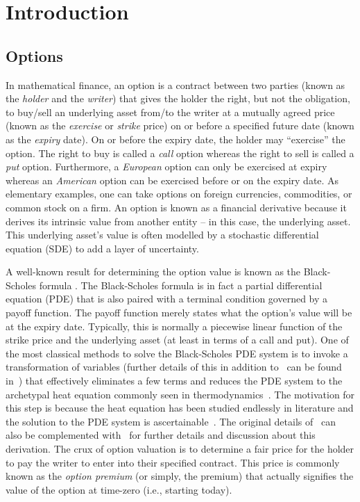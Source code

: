 \chapter{Introduction}
\section{Options}

	In mathematical finance, an option is a contract between two parties (known as the \emph{holder} and the \emph{writer}) that gives the holder the right, but not the obligation, to buy/sell an underlying asset from/to the writer at a mutually agreed price (known as the \emph{exercise} or \emph{strike} price) on or before a specified future date (known as the \emph{expiry} date). On or before the expiry date, the holder may ``exercise'' the option. The right to buy is called a \emph{call} option whereas the right to sell is called a \emph{put} option. Furthermore, a \emph{European} option can only be exercised at expiry whereas an \emph{American} option can be exercised before or on the expiry date. As elementary examples, one can take options on foreign currencies, commodities, or common stock on a firm. An option is known as a financial derivative because it derives its intrinsic value from another entity -- in this case, the underlying asset. This underlying asset's value is often modelled by a stochastic differential equation (SDE) to add a layer of uncertainty. 
	
	A well-known result for determining the option value is known as the Black-Scholes formula \cite{Black1973}. The Black-Scholes formula is in fact a partial differential equation (PDE) that is also paired with a terminal condition governed by a payoff function. The payoff function merely states what the option's value will be at the expiry date. Typically, this is normally a piecewise linear function of the strike price and the underlying asset (at least in terms of a call and put). One of the most classical methods to solve the Black-Scholes PDE system is to invoke a transformation of variables (further details of this in addition to~\cite{Black1973} can be found in~\cite{Wilmott1995}) that effectively eliminates a few terms and reduces the PDE system to the archetypal heat equation commonly seen in thermodynamics~\cite{cannon1984one}. The motivation for this step is because the heat equation has been studied endlessly in literature and the solution to the PDE system is ascertainable~\cite{Churchill1938}. The original details of~\cite{Black1973} can also be complemented with~\cite{Wilmott1995} for further details and discussion about this derivation. The crux of option valuation is to determine a fair price for the holder to pay the writer to enter into their specified contract. This price is commonly known as the \emph{option premium} (or simply, the premium) that actually signifies the value of the option at time-zero (i.e., starting today).
	
